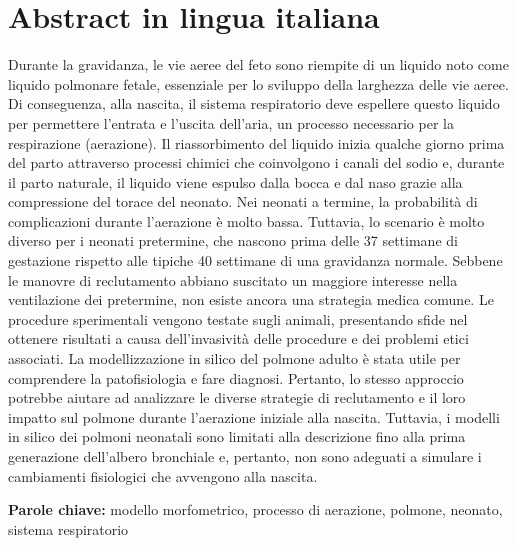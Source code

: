 \section*{Abstract in lingua italiana}
Durante la gravidanza, le vie aeree del feto sono riempite di un
liquido noto come liquido polmonare fetale, essenziale per lo sviluppo
della larghezza delle vie aeree. Di conseguenza, alla nascita, il
sistema respiratorio deve espellere questo liquido per permettere
l'entrata e l'uscita dell'aria, un processo necessario per la
respirazione (aerazione). Il riassorbimento del liquido inizia qualche
giorno prima del parto attraverso processi chimici che coinvolgono i
canali del sodio e, durante il parto naturale, il liquido viene
espulso dalla bocca e dal naso grazie alla compressione del torace del
neonato. Nei neonati a termine, la probabilità di complicazioni
durante l'aerazione è molto bassa. Tuttavia, lo scenario è molto
diverso per i neonati pretermine, che nascono prima delle 37 settimane
di gestazione rispetto alle tipiche 40 settimane di una gravidanza
normale.  Sebbene le manovre di reclutamento abbiano suscitato un
maggiore interesse nella ventilazione dei pretermine, non esiste
ancora una strategia medica comune. Le procedure sperimentali vengono
testate sugli animali, presentando sfide nel ottenere risultati a
causa dell'invasività delle procedure e dei problemi etici
associati. La modellizzazione in silico del polmone adulto è stata
utile per comprendere la patofisiologia e fare diagnosi. Pertanto, lo
stesso approccio potrebbe aiutare ad analizzare le diverse strategie
di reclutamento e il loro impatto sul polmone durante l'aerazione
iniziale alla nascita. Tuttavia, i modelli in silico dei polmoni
neonatali sono limitati alla descrizione fino alla prima generazione
dell'albero bronchiale e, pertanto, non sono adeguati a simulare i
cambiamenti fisiologici che avvengono alla nascita.  \vspace{15pt}


\begin{tcolorbox}[arc=0pt, boxrule=0pt, colback=bluePoli!60, width=\textwidth, colupper=white]
  \textbf{Parole chiave:} modello morfometrico, processo di aerazione, polmone, neonato, sistema respiratorio
\end{tcolorbox}
